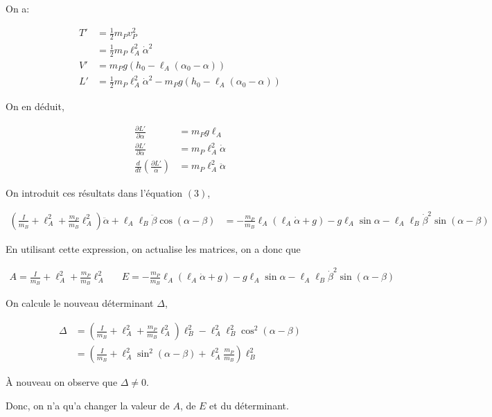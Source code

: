 \documentclass[10pt]{article}
\begin{document}
On a:

\begin{align*}
 T' &= \frac12m_Pv_P^2 \\
    &= \frac12m_P\ell_A^2\dot{\alpha}^2 \\
 V' &= m_Pg\left(h_0-\ell_A(\alpha_0-\alpha)\right) \\
 L' &= \frac12m_P\ell_A^2\dot{\alpha}^2 - m_Pg\left(h_0-\ell_A(\alpha_0-\alpha)\right)
\end{align*}

On en déduit,

\begin{align*}
 \frac{\partial L'}{\partial \alpha} &= m_Pg\ell_A \\
 \frac{\partial L'}{\partial \dot{\alpha}} &= m_P\ell_A^2\dot{\alpha} \\
 \frac{d}{dt}\left(\frac{\partial L'}{\dot{\alpha}}\right) &= m_P\ell_A^2\ddot{\alpha} 
\end{align*}

On introduit ces résultats dans l'équation $(3)$,

\begin{align}
  \left(\frac{I}{m_B}+\ell_A^2+\frac{m_P}{m_B}\ell_A^2\right)\ddot{\alpha} + \ell_A\ell_B\ddot{\beta}\cos{(\alpha-\beta)} &= -\frac{m_P}{m_B}\ell_A\left(\ell_A\dot{\alpha} + g\right)-g\ell_A\sin{\alpha}-\ell_A\ell_B\dot{\beta}^2\sin{(\alpha-\beta)}
\end{align}

En utilisant cette expression, on actualise les matrices, on a donc que

\begin{align*}
 A = \frac{I}{m_B}+\ell_A^2+\frac{m_P}{m_B}\ell_A^2 && E = -\frac{m_P}{m_B}\ell_A\left(\ell_A\dot{\alpha} + g\right)-g\ell_A\sin{\alpha}-\ell_A\ell_B\dot{\beta}^2\sin{(\alpha-\beta)}
\end{align*}


On calcule le nouveau déterminant $\Delta$,

\begin{align*}
 \Delta &= \left(\frac{I}{m_B}+\ell_A^2+\frac{m_P}{m_B}\ell_A^2\right)\ell_B^2 -\ell_A^2\ell_B^2\cos^2{(\alpha-\beta)} \\
	&= \left(\frac{I}{m_B}+\ell_A^2\sin^2{(\alpha-\beta)}+\ell_A^2\frac{m_P}{m_B}\right)\ell_B^2
\end{align*}

À nouveau on observe que $\Delta \neq 0$.

Donc, on n'a qu'a changer la valeur de $A$, de $E$ et du déterminant.
\end{document}
